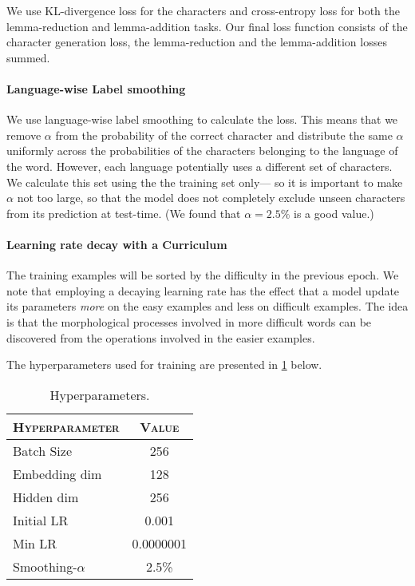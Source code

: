 \documentclass[11pt,a4paper]{article}
\begin{document}
We use KL-divergence loss for the characters and cross-entropy loss for both the lemma-reduction and
lemma-addition tasks. Our final loss function consists of the
character generation loss, the lemma-reduction and the lemma-addition
losses summed.

\paragraph{Language-wise Label smoothing} We use language-wise label
smoothing to calculate the loss. This means that we remove $\alpha$
from the probability of the correct character and distribute the same
$\alpha$ uniformly across the probabilities of the characters
belonging to the language of the word. However, each language
potentially uses a different set of characters. We calculate this set
using the the training set only--- so it is important to make $\alpha$
not too large, so that the model does not completely exclude unseen
characters from its prediction at test-time. (We found that
\(\alpha=2.5\%\) is a good value.)

\paragraph{Learning rate decay with a Curriculum} The training
examples will be sorted by the difficulty in the previous epoch.  We
note that employing a decaying learning rate has the effect that a
model update its parameters \textit{more} on the easy examples and
less on difficult examples. The idea is that the morphological
processes involved in more difficult words can be discovered from the
operations involved in the easier examples.

The hyperparameters used for training are presented in \cref{tab:hp} below.
\begin{table}[h]	
\centering
\begin{tabular}{lc}
\textsc{Hyperparameter} & \textsc{Value} \\
  \hline
  Batch Size & 256 \\
  Embedding dim & 128 \\
  Hidden dim & 256 \\
  Initial LR & 0.001 \\
  Min LR & 0.0000001 \\
  Smoothing-$\alpha$ & 2.5\% \\
\end{tabular} 
\caption{Hyperparameters.}
\label{tab:hp}
\end{table}
\end{document}
